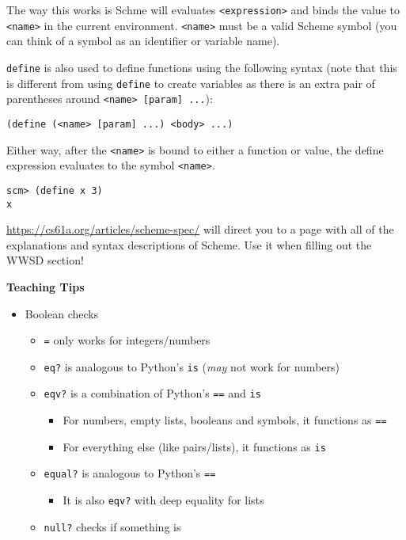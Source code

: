 The way this works is Schme will evaluates \lstinline{<expression>} and binds the value to \lstinline{<name>} in the current environment. \lstinline{<name>} must be a valid Scheme symbol (you can think of a symbol as an identifier or variable name).

\lstinline{define} is also used to define functions using the following syntax (note that this is different from using \lstinline{define} to create variables as there is an extra pair of parentheses around \lstinline{<name> [param] ...}):
\begin{lstlisting}
(define (<name> [param] ...) <body> ...)
\end{lstlisting}

Either way, after the \lstinline{<name>} is bound to either a function or value, the define expression evaluates to the symbol \lstinline{<name>}.
\begin{lstlisting}
scm> (define x 3)
x
\end{lstlisting}

\url{https://cs61a.org/articles/scheme-spec/} will direct you to a page with all of the explanations and syntax descriptions of Scheme. Use it when filling out the WWSD section!

\begin{blocksection}
\begin{guide}
\textbf{Teaching Tips}
\begin{itemize}
    \item Boolean checks
        \begin{itemize}
        \item \lstinline{=} only works for integers/numbers
        \item \lstinline{eq?} is analogous to Python's \lstinline{is} (\textit{may} not work for numbers)
        \item \lstinline{eqv?} is a combination of Python's \lstinline{==} and \lstinline{is}
        \begin{itemize}
            \item For numbers, empty lists, booleans and symbols, it functions as \lstinline{==}
            \item For everything else (like pairs/lists), it functions as \lstinline{is}
        \end{itemize}
        \item \lstinline{equal?} is analogous to Python's \lstinline{==}
        \begin{itemize}
            \item It is also \lstinline{eqv?} with deep equality for lists
        \end{itemize}
        \item \lstinline{null?} checks if something is \lstinline{}
        \end{itemize}
\end{itemize}
\end{guide}
\end{blocksection}